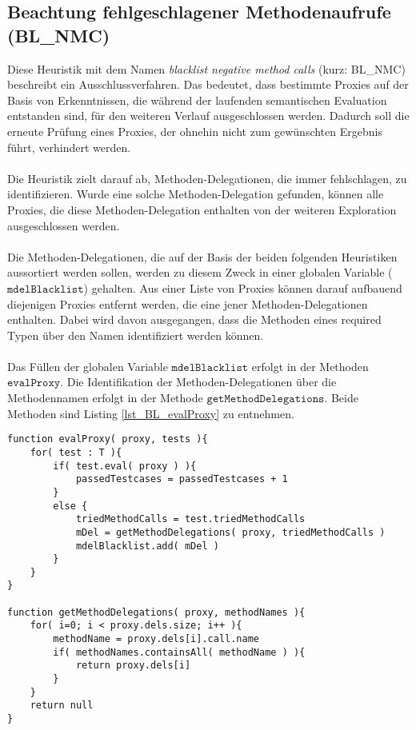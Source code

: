 \subsection{Beachtung fehlgeschlagener Methodenaufrufe (BL\_NMC)}\label{sec_bl_nmc}
Diese Heuristik mit dem Namen \emph{blacklist negative method calls} (kurz: BL\_NMC) beschreibt ein Ausschlussverfahren. Das bedeutet, dass bestimmte Proxies auf der Basis von Erkenntnissen, die während der laufenden semantischen Evaluation entstanden sind, für den weiteren Verlauf ausgeschlossen werden. Dadurch soll die erneute Prüfung eines Proxies, der ohnehin nicht zum gewünschten Ergebnis führt, verhindert werden.
\\\\
Die Heuristik zielt darauf ab, Methoden-Delegationen, die immer fehlschlagen, zu identifizieren. Wurde eine solche Methoden-Delegation gefunden, können alle Proxies, die diese Methoden-Delegation enthalten von der weiteren Exploration ausgeschlossen werden.
\\\\
Die Methoden-Delegationen, die auf der Basis der beiden folgenden Heuristiken aussortiert werden sollen, werden zu diesem Zweck in einer globalen Variable ($\texttt{mdelBlacklist}$) gehalten. Aus einer Liste von Proxies können darauf aufbauend diejenigen Proxies entfernt werden, die eine jener Methoden-Delegationen enthalten. Dabei wird davon ausgegangen, dass die Methoden eines required Typen über den Namen identifiziert werden können.
\\\\
Das Füllen der globalen Variable $\texttt{mdelBlacklist}$ erfolgt in der Methoden $\texttt{evalProxy}$. Die Identifikation der Methoden-Delegationen über die Methodennamen erfolgt in der Methode $\texttt{getMethodDelegations}$. Beide Methoden sind Listing \ref{lst_BL_evalProxy} zu entnehmen.
\begin{lstlisting}[style = pseudo, caption = Evaluierung einzelner Proxies mit BL\_MNC, captionpos = b, label = lst_BL_evalProxy]
function evalProxy( proxy, tests ){
	for( test : T ){	
		if( test.eval( proxy ) ){
			passedTestcases = passedTestcases + 1
		}
		else {
			triedMethodCalls = test.triedMethodCalls
			mDel = getMethodDelegations( proxy, triedMethodCalls )
			mdelBlacklist.add( mDel )
		}		
	}
}

function getMethodDelegations( proxy, methodNames ){
	for( i=0; i < proxy.dels.size; i++ ){
		methodName = proxy.dels[i].call.name
		if( methodNames.containsAll( methodName ) ){
			return proxy.dels[i]
		}
	}
	return null
}
\end{lstlisting}
